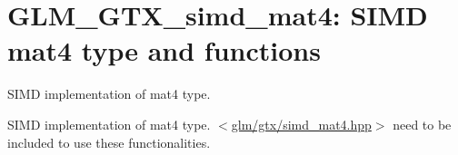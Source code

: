 \hypertarget{group__gtx__simd__mat4}{\section{\-G\-L\-M\-\_\-\-G\-T\-X\-\_\-simd\-\_\-mat4\-: \-S\-I\-M\-D mat4 type and functions}
\label{group__gtx__simd__mat4}
}


\-S\-I\-M\-D implementation of mat4 type.  


\-S\-I\-M\-D implementation of mat4 type. $<$\hyperlink{simd__mat4_8hpp_source}{glm/gtx/simd\-\_\-mat4.\-hpp}$>$ need to be included to use these functionalities. 